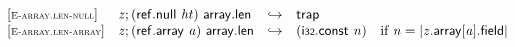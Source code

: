 \vspace{1ex}

$$
\begin{array}{@{}l@{}lcl@{}l@{}}
{[\textsc{\scriptsize E{-}array.len{-}null}]} \quad & {\mathit{z}} ; (\mathsf{ref.null}~{\mathit{ht}})~\mathsf{array.len} &\hookrightarrow& \mathsf{trap} &  \\
{[\textsc{\scriptsize E{-}array.len{-}array}]} \quad & {\mathit{z}} ; (\mathsf{ref.array}~{\mathit{a}})~\mathsf{array.len} &\hookrightarrow& (\mathsf{i{\scriptstyle32}}.\mathsf{const}~{\mathit{n}}) &\quad
  \mbox{if}~{\mathit{n}} = {|{\mathit{z}}.\mathsf{array}{}[{\mathit{a}}].\mathsf{field}|} \\
\end{array}
$$

\vspace{1ex}

